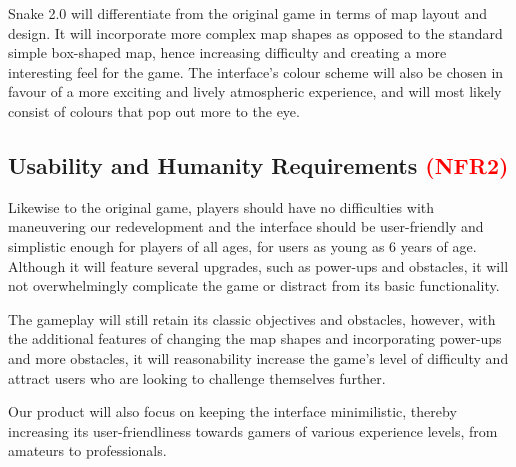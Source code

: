 \documentclass[12pt, titlepage]{article}
\begin{document}
Snake 2.0  will differentiate from the original game in terms of map layout and design. It will incorporate more complex map shapes as opposed to the standard simple box-shaped map, hence increasing difficulty and creating a more interesting feel for the game. The interface's colour scheme will also be chosen in favour of a more exciting and lively atmospheric experience, and will most likely consist of colours that pop out more to the eye.

\subsection{Usability and Humanity Requirements \textcolor{red}{(\textbf{NFR2})}\label{NFR2}}
Likewise to the original game, players should have no difficulties with maneuvering our redevelopment and the interface should be user-friendly and simplistic enough for players of all ages, for users as young as 6 years of age. Although it will feature several upgrades, such as power-ups and obstacles, it will not overwhelmingly complicate the game or distract from its basic functionality. 

The gameplay will still retain its classic objectives and obstacles, however, with the additional features of changing the map shapes and incorporating power-ups and more obstacles, it will reasonability increase the game's level of difficulty and attract users who are looking to challenge themselves further. 

Our product will also focus on keeping the interface minimilistic, thereby increasing its user-friendliness towards gamers of various experience levels, from amateurs to professionals.
\end{document}
